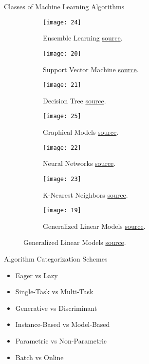 \documentclass[compress,oilve]{beamer}
\begin{document}
\begin{frame}{Classes of Machine Learning Algorithms}
\begin{figure}
	\begin{subfigure}{0.16\textwidth}
\centering
 \texttt{[image: 24]}  
 \caption{Ensemble Learning \href{https://vitalflux.com/5-common-ensemble-methods-in-machine-learning/}{source}.}
	\end{subfigure}
          \hfill
	\begin{subfigure}{0.16\textwidth}
\centering
 \texttt{[image: 20]}  
 \caption{Support Vector Machine \href{https://en.wikipedia.org/wiki/Support-vector_machine}{source}.}
	\end{subfigure}
	\hfill
\begin{subfigure}{0.16\textwidth}
\centering
 \texttt{[image: 21]}  
 \caption{Decision Tree \href{https://www.researchgate.net/figure/Schematic-of-a-Decision-Tree-The-figure-shows-an-example-of-a-decision-tree-with-3_fig1_348456545}{source}.}
	\end{subfigure}
	\hfill
\begin{subfigure}{0.16\textwidth}
\centering
 \texttt{[image: 25]}  
 \caption{Graphical Models \href{https://www.researchgate.net/figure/Simple-directed-graphical-model-with-three-variables-To-illustrate-how-graphical-models_fig6_262407302}{source}.}
	\end{subfigure}
	\vfill
\begin{subfigure}{0.16\textwidth}
\centering
 \texttt{[image: 22]}  
 \caption{Neural Networks \href{https://www.spiceworks.com/tech/artificial-intelligence/articles/what-is-a-neural-network/}{source}.}
	\end{subfigure}
	\hfill
\begin{subfigure}{0.16\textwidth}
\centering
 \texttt{[image: 23]}  
 \caption{K-Nearest Neighbors \href{https://medium.com/@sanidhyaagrawal08/what-is-instance-based-learning-a9b06079e836}{source}.}
	\end{subfigure}
	\hfill
\begin{subfigure}{0.16\textwidth}
\centering
 \texttt{[image: 19]}  
 \caption{Generalized Linear Models \href{http://strijov.com/sources/demo_GLM.php}{source}.}
	\end{subfigure}
\end{figure}
\end{frame}


\begin{frame}{Algorithm Categorization Schemes}
\begin{itemize}
\item Eager vs Lazy
\item Single-Task vs Multi-Task
\item Generative vs Discriminant
\item Instance-Based vs Model-Based
\item Parametric vs Non-Parametric
\item Batch vs Online
\end{itemize}
\end{frame}
\end{document}
